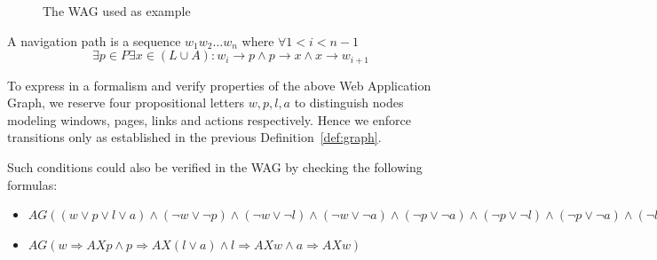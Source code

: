 \begin{figure}[ht]
\centerline{}
\caption{The WAG used as example \label{fig1}}
\end{figure}

\footnotesize
\begin{definition}\label{def:path}
 A navigation path is a sequence $ w_1 w_2 \ldots w_n $ where 
 $\forall 1 < i < n-1 $
 \[
  \exists p \in P \exists x \in (L\cup A) : w_i
 \rightarrow p \wedge p \rightarrow x \wedge x \rightarrow w_{i+1}
 \]
\end{definition}

\normalsize
To express in a \ctl formalism and verify properties of the above Web Application Graph, we reserve four propositional letters $w, p, l, a$ to distinguish nodes modeling windows, pages, links and actions respectively. Hence we enforce transitions only as established in the previous Definition~\ref{def:graph}. 

Such conditions could also be verified in the WAG by checking the following \ctl formulas:

\footnotesize
\begin{itemize}
	\item $ AG(( w \vee p \vee l \vee a) \wedge(\neg w \vee \neg p) \wedge (\neg w \vee \neg l) \wedge ( \neg w \vee \neg a) 			 
						\wedge(\neg p \vee \neg a) \wedge (\neg p \vee \neg l)\wedge (\neg p \vee \neg a)\wedge (\neg l \vee \neg a))$ \\
	\item $AG (w \Rightarrow AX p \wedge p \Rightarrow AX (l \vee a) \wedge l \Rightarrow AX w \wedge a \Rightarrow AX w)$ \end{itemize}


